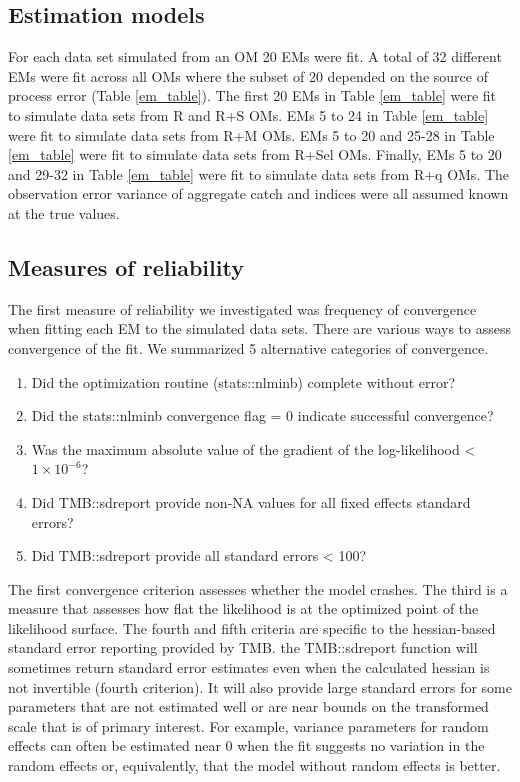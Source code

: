 \documentclass[
  12pt,
]{article}
\providecommand{\tightlist}{%
  \setlength{\itemsep}{0pt}\setlength{\parskip}{0pt}}
\begin{document}
\hypertarget{estimation-models}{%
\subsection*{Estimation models}\label{estimation-models}}

For each data set simulated from an OM 20 EMs were fit. A total of 32
different EMs were fit across all OMs where the subset of 20 depended on
the source of process error (Table \ref{em_table}). The first 20 EMs in
Table \ref{em_table} were fit to simulate data sets from R and R+S OMs.
EMs 5 to 24 in Table \ref{em_table} were fit to simulate data sets from
R+M OMs. EMs 5 to 20 and 25-28 in Table \ref{em_table} were fit to
simulate data sets from R+Sel OMs. Finally, EMs 5 to 20 and 29-32 in
Table \ref{em_table} were fit to simulate data sets from R+q OMs. The
observation error variance of aggregate catch and indices were all
assumed known at the true values.

\hypertarget{measures-of-reliability}{%
\subsection*{Measures of reliability}\label{measures-of-reliability}}

The first measure of reliability we investigated was frequency of
convergence when fitting each EM to the simulated data sets. There are
various ways to assess convergence of the fit. We summarized 5
alternative categories of convergence.

\begin{enumerate}
\def\labelenumi{\arabic{enumi}.}
\tightlist
\item
  Did the optimization routine (stats::nlminb) complete without error?
\item
  Did the stats::nlminb convergence flag = 0 indicate successful
  convergence?
\item
  Was the maximum absolute value of the gradient of the log-likelihood
  \textless{} \(1\times10^{-6}\)?
\item
  Did TMB::sdreport provide non-NA values for all fixed effects standard
  errors?
\item
  Did TMB::sdreport provide all standard errors \textless{} 100?
\end{enumerate}

The first convergence criterion assesses whether the model crashes. The
third is a measure that assesses how flat the likelihood is at the
optimized point of the likelihood surface. The fourth and fifth criteria
are specific to the hessian-based standard error reporting provided by
TMB. the TMB::sdreport function will sometimes return standard error
estimates even when the calculated hessian is not invertible (fourth
criterion). It will also provide large standard errors for some
parameters that are not estimated well or are near bounds on the
transformed scale that is of primary interest. For example, variance
parameters for random effects can often be estimated near 0 when the fit
suggests no variation in the random effects or, equivalently, that the
model without random effects is better.
\end{document}
